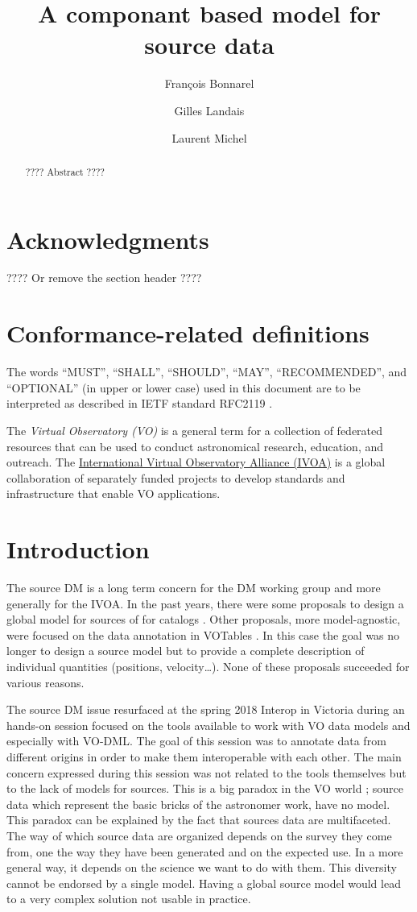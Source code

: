 \documentclass[11pt,a4paper]{ivoa}
\title{A componant based model for source data}
\author{François Bonnarel}
\author{Gilles Landais}
\author{Laurent Michel}
\begin{document}
\begin{abstract}
???? Abstract ????
\end{abstract}


\section*{Acknowledgments}

???? Or remove the section header ????

\section*{Conformance-related definitions}

The words ``MUST'', ``SHALL'', ``SHOULD'', ``MAY'', ``RECOMMENDED'', and
``OPTIONAL'' (in upper or lower case) used in this document are to be
interpreted as described in IETF standard RFC2119 \citep{std:RFC2119}.

The \emph{Virtual Observatory (VO)} is a
general term for a collection of federated resources that can be used
to conduct astronomical research, education, and outreach.
The \href{http://www.ivoa.net}{International
Virtual Observatory Alliance (IVOA)} is a global
collaboration of separately funded projects to develop standards and
infrastructure that enable VO applications.


\section{Introduction}

The source DM is a long term concern for the DM working group and more generally for the IVOA.
In the past years, there were some proposals to design a global model for sources \citep{wd:jesusdm} of for catalogs \citep{wd:catalog}.
Other proposals, more model-agnostic, were focused on the data annotation in VOTables \citep{note:stcvot} \citep{note:seb}. In this case the goal was no longer to design a source model but to provide a complete description of  individual quantities (positions, velocity…).
None of these proposals succeeded for various reasons. 

The source DM issue resurfaced at the spring 2018 Interop in Victoria during an hands-on session focused on the tools available to work with VO data models and especially with VO-DML. The goal of this session was to annotate data from different origins in order to make them interoperable with each other. The main concern expressed during this session was not related to the tools themselves but to the lack of models for sources. 
This is a big paradox in the VO world ; source data which represent the basic bricks of the astronomer work, have no model. This paradox can be explained by the fact that sources data are multifaceted. The way of which source data are organized depends on the survey they come from, one the way they have been generated  and on the expected use. In a more general way, it depends on the science we want to do with them. This diversity cannot be endorsed by a single model. Having a global source model would lead to a very complex solution not usable in practice.
\end{document}

